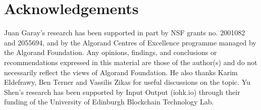 \section*{Acknowledgements}

Juan Garay's research has been supported in part by NSF grants no. 2001082 and 2055694, and by the Algorand Centres of Excellence programme managed by the Algorand Foundation.
%
Any opinions, findings, and conclusions or recommendations expressed in this material are those of the author(s) and do not necessarily reflect the views of Algorand Foundation.
%
He also thanks Karim Eldefrawy, Ben Terner and Vassilis Zikas for useful discussions on the topic.
%
Yu Shen's research has been supported by Input Output (iohk.io) through their funding of the University of Edinburgh Blockchain Technology Lab.
